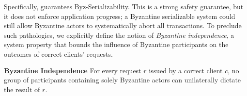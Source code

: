 %
%

Specifically, \sys{} guarantees Byz-Serializability.  This is a strong safety guarantee, but it does not enforce application progress; a Byzantine serializable system could still allow Byzantine actors to systematically abort all transactions. To preclude such pathologies, we explicitly define the notion of \textit{Byzantine independence}, a %
system property that bounds the influence of Byzantine participants on the outcomes of correct clients' requests.




 \par \textbf{Byzantine Independence} For every request $r$ issued by a correct client $c$,  no group of participants containing solely Byzantine actors can unilaterally dictate the result of $r$.


